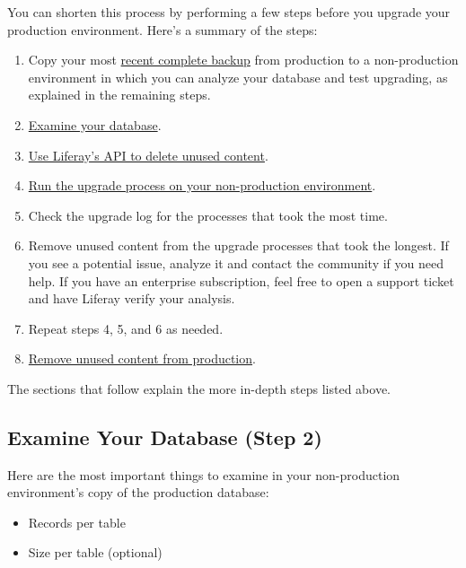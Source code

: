 You can shorten this process by performing a few steps before you
upgrade your production environment. Here's a summary of the steps:

\begin{enumerate}
\def\labelenumi{\arabic{enumi}.}
\tightlist
\item
  Copy your most
  \href{/docs/7-0/deploy/-/knowledge_base/d/backing-up-a-liferay-installation}{recent
  complete backup} from production to a non-production environment in
  which you can analyze your database and test upgrading, as explained
  in the remaining steps.
\item
  \hyperref[examine-your-database-step-2]{Examine your database}.
\item
  \hyperref[use-liferays-api-to-remove-unused-objects-step-3]{Use
  Liferay's API to delete unused content}.
\item
  \hyperref[execute-the-upgrade-process-step-4]{Run the upgrade process
  on your non-production environment}.
\item
  Check the upgrade log for the processes that took the most time.
\item
  Remove unused content from the upgrade processes that took the
  longest. If you see a potential issue, analyze it and contact the
  community if you need help. If you have an enterprise subscription,
  feel free to open a support ticket and have Liferay verify your
  analysis.
\item
  Repeat steps 4, 5, and 6 as needed.
\item
  \hyperref[remove-unused-objects-from-production-step-8]{Remove unused
  content from production}.
\end{enumerate}

The sections that follow explain the more in-depth steps listed above.

\subsection{Examine Your Database (Step
2)}\label{examine-your-database-step-2}

Here are the most important things to examine in your non-production
environment's copy of the production database:

\begin{itemize}
\tightlist
\item
  Records per table
\item
  Size per table (optional)
\end{itemize}

